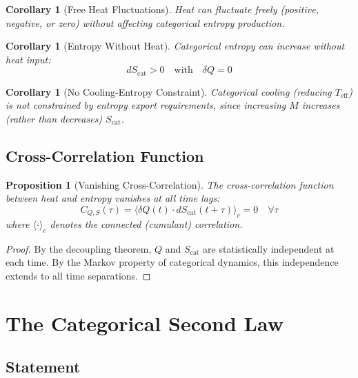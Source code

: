 \documentclass[twocolumn,10pt,twoside]{article}
\newtheorem{proposition}[theorem]{Proposition}
\newtheorem{corollary}[theorem]{Corollary}
\newcommand{\Teff}{T_{\mathrm{eff}}}
\newcommand{\Scat}{S_{\mathrm{cat}}}
\begin{document}
\begin{corollary}[Free Heat Fluctuations]
Heat can fluctuate freely (positive, negative, or zero) without affecting categorical entropy production.
\end{corollary}

\begin{corollary}[Entropy Without Heat]
Categorical entropy can increase without heat input:
\begin{equation}
d\Scat > 0 \quad \text{with} \quad \delta Q = 0
\end{equation}
\end{corollary}

\begin{corollary}[No Cooling-Entropy Constraint]
Categorical cooling (reducing $\Teff$) is not constrained by entropy export requirements, since increasing $M$ increases (rather than decreases) $\Scat$.
\end{corollary}

\subsection{Cross-Correlation Function}

\begin{proposition}[Vanishing Cross-Correlation]
The cross-correlation function between heat and entropy vanishes at all time lags:
\begin{equation}
C_{Q,S}(\tau) = \langle \delta Q(t) \cdot d\Scat(t+\tau) \rangle_c = 0 \quad \forall \tau
\end{equation}
where $\langle \cdot \rangle_c$ denotes the connected (cumulant) correlation.
\end{proposition}

\begin{proof}
By the decoupling theorem, $Q$ and $\Scat$ are statistically independent at each time. By the Markov property of categorical dynamics, this independence extends to all time separations.
\end{proof}

\section{The Categorical Second Law}

\subsection{Statement}
\end{document}

